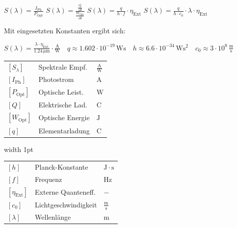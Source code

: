 $\boxed{
S(\lambda) 
= \frac{I_{\text{Ph}}}{P_{\text{Opt}}}
}$  $\boxed{
S(\lambda) 
= \frac{\frac{Q}{\Delta t}}{\frac{W_{\text{Opt}}}{\Delta t}}
}$  $\boxed{
S(\lambda) 
= \frac{q}{h \cdot f} \cdot \eta_{\text{Ext}}
}$  $\boxed{
S(\lambda) 
= \frac{q}{h \cdot c_0} \cdot \lambda \cdot \eta_{\text{Ext}}
}$

\vspace{0.1cm}

Mit eingesetzten Konstanten ergibt sich:

\vspace{0.1cm}

$
\boxed{S(\lambda) = \frac{\lambda \cdot \eta_{\text{Ext}}}{1.24 \, \mathrm{\mu m}} \cdot \frac{\mathrm{A}}{\mathrm{W}}}
\quad
q \approx1.602 \cdot 10^{-19} \, \mathrm{Ws}
\quad
h \approx 6.6 \cdot 10^{-34} \, \mathrm{Ws^2}
\quad
c_0 \approx 3 \cdot 10^{8} \, \mathrm{\frac{m}{s}}
$

\vspace{0.1cm}

\begin{minipage}[t]{0.48\columnwidth}
    \renewcommand{\arraystretch}{1.2}
    \begin{tabular}{@{} l p{2.8cm} l @{}}
        $[S_\lambda]$       & Spektrale Empf. \dotfill          & $\frac{\mathrm{A}}{\mathrm{W}}$ \\
        $[I_\mathrm{Ph}]$   & Photostrom \dotfill               & $\mathrm{A}$ \\
        $[P_\mathrm{Opt}]$  & Optische Leist. \dotfill          & $\mathrm{W}$ \\
        $[Q]$               & Elektrische Lad. \dotfill         & $\mathrm{C}$ \\
        $[W_\mathrm{Opt}]$  & Optische Energie \dotfill         & $\mathrm{J}$ \\
        $[q]$               & Elementarladung \dotfill          & $\mathrm{C}$ 
    \end{tabular}
\end{minipage}
\hfill
\vrule width 1pt
\hfill
\begin{minipage}[t]{0.48\columnwidth}
    \renewcommand{\arraystretch}{1.2}
    \begin{tabular}{@{} l p{2.8cm} l @{}}
        $[h]$                 & Planck-Konstante \dotfill         & $\mathrm{J \cdot s}$ \\
        $[f]$                 & Frequenz \dotfill                 & $\mathrm{Hz}$ \\
        $[\eta_\mathrm{Ext}]$ & Externe Quanteneff. \dotfill      & $-$ \\
        $[c_0]$               & Lichtgeschwindigkeit \dotfill     & $\frac{\mathrm{m}}{\mathrm{s}}$\\
        $[\lambda]$           & Wellenlänge \dotfill              & $\mathrm{m}$
    \end{tabular}
\end{minipage}



